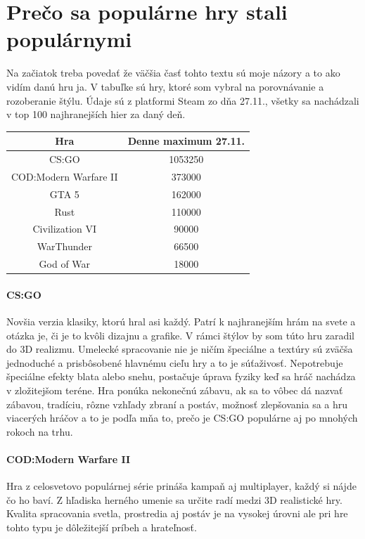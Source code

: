 \documentclass[10pt,twoside,slovak,a4paper]{article}
\begin{document}
\section{Prečo sa populárne hry stali populárnymi}
Na začiatok treba povedať že väčšia časť tohto textu sú moje názory a to ako vidím danú hru ja. V tabuľke sú hry, ktoré som vybral na porovnávanie a rozoberanie štýlu. Údaje sú z platformi Steam zo dňa 27.11., všetky sa nachádzali v top 100 najhranejších hier za daný deň.

\begin{center}
\begin{tabular}{ |c| c| }
\hline
 Hra & Denne maximum 27.11. \\
\hline
 CS:GO & 1053250 \\
\hline
 COD:Modern Warfare II & 373000 \\
\hline
 GTA 5 & 162000 \\
\hline
 Rust & 110000 \\
\hline
 Civilization VI & 90000 \\
\hline
 WarThunder & 66500 \\
\hline
 God of War & 18000 \\
\hline
\end{tabular}
\end{center}

\paragraph{CS:GO}
Novšia verzia klasiky, ktorú hral asi každý. Patrí k najhranejším hrám na svete a otázka je, či je to kvôli dizajnu a grafike. V rámci štýlov by som túto hru zaradil do 3D realizmu. Umelecké spracovanie nie je ničím špeciálne a textúry sú zväčša jednoduché a prisbôsobené hlavnému cieľu hry a to je súťaživosť. Nepotrebuje špeciálne efekty blata alebo snehu, postačuje úprava fyziky keď sa hráč nachádza v zložitejšom teréne. Hra ponúka nekonečnú zábavu, ak sa to vôbec dá nazvať zábavou, tradíciu, rôzne vzhľady zbraní a postáv, možnosť zlepšovania sa a hru viacerých hráčov a to je podľa mňa to, prečo je CS:GO populárne aj po mnohých rokoch na trhu.

\paragraph{COD:Modern Warfare II}
Hra z celosvetovo populárnej série prináša kampaň aj multiplayer, každý si nájde čo ho baví. Z hľadiska herného umenie sa určite radí medzi 3D realistické hry. Kvalita spracovania svetla, prostredia aj postáv je na vysokej úrovni ale pri hre tohto typu je dôležitejší príbeh a hrateľnosť.
\end{document}
